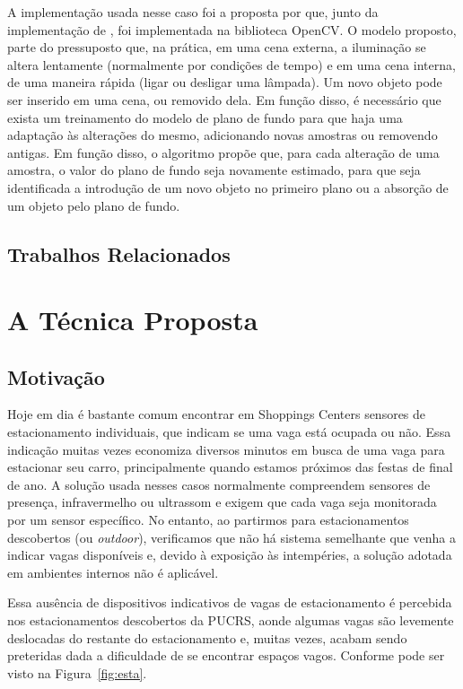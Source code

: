 \documentclass[ecp,tc]{iiufrgs}
\begin{document}
A implementação usada nesse caso foi a proposta por  que, junto da implementação de , foi implementada na biblioteca OpenCV. O modelo proposto, parte do pressuposto que, na prática, em uma cena externa, a iluminação se altera lentamente (normalmente por condições de tempo) e em uma cena interna, de uma maneira rápida (ligar ou desligar uma lâmpada). Um novo objeto pode ser inserido em uma cena, ou removido dela. Em função disso, é necessário que exista um treinamento do modelo de plano de fundo para que haja uma adaptação às alterações do mesmo, adicionando novas amostras ou removendo antigas. Em função disso, o algoritmo propõe que, para cada alteração de uma amostra, o valor do plano de fundo seja novamente estimado, para que seja identificada a introdução de um novo objeto no primeiro plano ou a absorção de um objeto pelo plano de fundo.

\section{Trabalhos Relacionados}

\chapter{A Técnica Proposta}

\section{Motivação}

Hoje em dia é bastante comum encontrar em Shoppings Centers sensores de estacionamento individuais, que indicam se uma vaga está ocupada ou não. Essa indicação muitas vezes economiza diversos minutos em busca de uma vaga para estacionar seu carro, principalmente quando estamos próximos das festas de final de ano. A solução usada nesses casos normalmente compreendem sensores de presença, infravermelho ou ultrassom e exigem que cada vaga seja monitorada por um sensor específico. No entanto, ao partirmos para estacionamentos descobertos (ou \textit{outdoor}), verificamos que não há sistema semelhante que venha a indicar vagas disponíveis e, devido à exposição às intempéries, a solução adotada em ambientes internos não é aplicável.

Essa ausência de dispositivos indicativos de vagas de estacionamento é percebida nos estacionamentos descobertos da PUCRS, aonde algumas vagas são levemente deslocadas do restante do estacionamento e, muitas vezes, acabam sendo preteridas dada a dificuldade de se encontrar espaços vagos. Conforme pode ser visto na Figura~\ref{fig:esta}.
\end{document}
